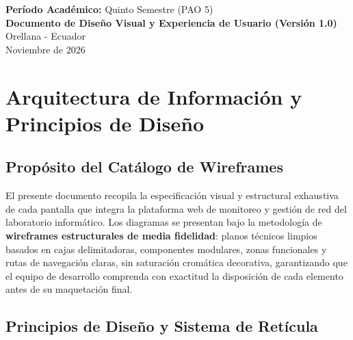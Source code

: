 \documentclass[12pt,a4paper]{report}
\begin{document}
\begin{titlepage}
  \vfill

  {\small\textbf{Período Académico:} Quinto Semestre (PAO 5)}\\[0.05cm]
  {\small\textbf{Documento de Diseño Visual y Experiencia de Usuario (Versión 1.0)}}\\[0.6cm]

  {\small Orellana - Ecuador}\\[0.15cm]
  {\small Noviembre de 2026}
\end{titlepage}

\tableofcontents
\newpage
\listoffigures
\newpage
\listoftables
\newpage

\chapter{Arquitectura de Información y Principios de Diseño}

\section{Propósito del Catálogo de Wireframes}

El presente documento recopila la especificación visual y estructural exhaustiva de cada pantalla que integra la plataforma web de monitoreo y gestión de red del laboratorio informático. Los diagramas se presentan bajo la metodología de \textbf{wireframes estructurales de media fidelidad}: planos técnicos limpios basados en cajas delimitadoras, componentes modulares, zonas funcionales y rutas de navegación claras, sin saturación cromática decorativa, garantizando que el equipo de desarrollo comprenda con exactitud la disposición de cada elemento antes de su maquetación final.

\section{Principios de Diseño y Sistema de Retícula}
\end{document}
